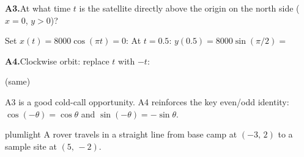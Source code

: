 \documentclass[10pt]{article}
\begin{document}
\vspace{0.08in}

\begin{tcolorbox}[colback=white, colframe=black!40,
    title=\textbf{Tier A --- Approaching Proficiency},
    fonttitle=\bfseries, arc=2mm, left=3mm, right=3mm, top=2mm, bottom=2mm]

\textbf{A3.}\quad At what time $t$ is the satellite directly above the
origin on the north side ($x = 0$, $y > 0$)?

\vspace{4pt}
Set $x(t) = 8000\cos(\pi t) = 0$: 
At $t = 0.5$: $y(0.5) = 8000\sin(\pi/2) = $  

\vspace{0.04in}
\textbf{A4.}\quad Clockwise orbit: replace $t$ with $-t$:

 \quad (same)


\begin{teachernote}
  A3 is a good cold-call opportunity. A4 reinforces the key even/odd
  identity: $\cos(-\theta) = \cos\theta$ and $\sin(-\theta) = -\sin\theta$.
\end{teachernote}

\end{tcolorbox}

\vspace{0.08in}

\begin{scenariobox}{plumlight}
A rover travels in a straight line from base camp at $(-3,\,2)$ to a
sample site at $(5,\,-2)$.
\end{scenariobox}

\vspace{0.08in}
\end{document}
